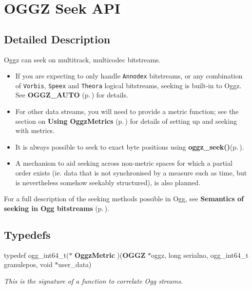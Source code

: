\section{OGGZ Seek API}
\label{group__seek__api}


\subsection{Detailed Description}
Oggz can seek on multitrack, multicodec bitstreams. 

\begin{itemize}
\item If you are expecting to only handle {\tt Annodex} bitstreams, or any combination of {\tt Vorbis}, {\tt Speex} and {\tt Theora} logical bitstreams, seeking is built-in to Oggz. See {\bf OGGZ\_\-AUTO }{\rm (p.\,\pageref{group__auto})} for details.\end{itemize}


\begin{itemize}
\item For other data streams, you will need to provide a metric function; see the section on {\bf Using Oggz\-Metrics }{\rm (p.\,\pageref{group__metric})} for details of setting up and seeking with metrics.\end{itemize}


\begin{itemize}
\item It is always possible to seek to exact byte positions using {\bf oggz\_\-seek()}{\rm (p.\,\pageref{group__seek__api_ga8})}.\end{itemize}


\begin{itemize}
\item A mechanism to aid seeking across non-metric spaces for which a partial order exists (ie. data that is not synchronised by a measure such as time, but is nevertheless somehow seekably structured), is also planned.\end{itemize}


For a full description of the seeking methods possible in Ogg, see {\bf Semantics of seeking in Ogg bitstreams }{\rm (p.\,\pageref{group__seek__semantics})}. 

\subsection*{Typedefs}
\begin{CompactItemize}
\item 
typedef ogg\_\-int64\_\-t($\ast$ {\bf Oggz\-Metric} )({\bf OGGZ} $\ast$oggz, long serialno, ogg\_\-int64\_\-t granulepos, void $\ast$user\_\-data)
\begin{CompactList}\small\item\em This is the signature of a function to correlate Ogg streams. \item\end{CompactList}\end{CompactItemize}
